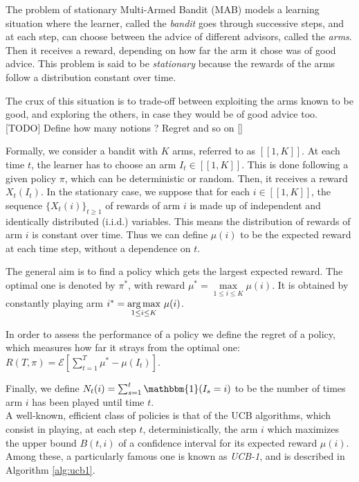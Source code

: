 The problem of stationary Multi-Armed Bandit (MAB) models a learning situation where the learner, called the \textit{bandit} goes through successive steps, and at each step, can choose between the advice of different advisors, called the \textit{arms}. Then it receives a reward, depending on how far the arm it chose was of good advice. This problem is said to be \textit{stationary} because the rewards of the arms follow a distribution constant over time.

The crux of this situation is to trade-off between exploiting the arms known to be good, and exploring the others, in case they would be of good advice too.\\

[TODO] Define how many notions ? Regret and so on []

Formally, we consider a bandit with $K$ arms, referred to as $[\![1,K]\!]$. At each time $t$, the learner has to choose an arm $I_t \in [\![1,K]\!]$. This is done following a given policy $\pi$, which can be deterministic or random. Then, it receives a reward $X_t(I_t)$. In the stationary case, we suppose that for each $i \in [\![1,K]\!]$, the sequence $\{X_t(i)\}_{t \geq 1}$ of rewards of arm $i$ is made up of independent and identically distributed (i.i.d.) variables. This means the distribution of rewards of arm $i$ is constant over time. Thus we can define $\mu(i)$ to be the expected reward at each time step, without a dependence on $t$.

The general aim is to find a policy which gets the largest expected reward. The optimal one is denoted by $\pi^*$, with reward $\mu^*=\underset{1\leq i \leq K}{\max} \mu(i)$. It is obtained by constantly playing arm $i^* = \underset{1\leq i \leq K}{\operatorname*{arg\,max}}\ \mu(i)$.

In order to assess the performance of a policy we define the regret of a policy, which measures how far it strays from the optimal one: $R(T,\pi)=\mathcal{E}\left[\sum_{t=1}^T \mu^* - \mu(I_t) \right]$.

Finally, we define $N_t(i)=\sum_{s=1}^t \mathbbm{1}(I_s=i)$ to be the number of times arm $i$ has been played until time $t$.\\

A well-known, efficient class of policies is that of the UCB	algorithms, which consist in playing, at each step $t$, deterministically, the arm $i$ which maximizes the upper bound $B(t,i)$ of a confidence interval for its expected reward $\mu(i)$.
Among these, a particularly famous one is known as \textit{UCB-1}, and is described in Algorithm \ref{alg:ucb1}.

